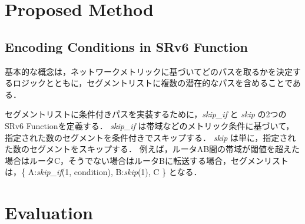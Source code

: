 \documentclass[conference]{IEEEtran}
\begin{document}


\section{Proposed Method}
\subsection{Encoding Conditions in SRv6 Function}

基本的な概念は，ネットワークメトリックに基づいてどのパスを取るかを決定するロジックとともに，セグメントリストに複数の潜在的なパスを含めることである．

セグメントリストに条件付きパスを実装するために，\textit{skip\_if} と \textit{skip} の2つのSRv6 Functionを定義する．
\textit{skip\_if} は帯域などのメトリック条件に基づいて，指定された数のセグメントを条件付きでスキップする．
\textit{skip} は単に，指定された数のセグメントをスキップする．
例えば，ルータAB間の帯域が閾値を超えた場合はルータC，そうでない場合はルータBに転送する場合，セグメンリストは，\{ A:\textit{skip\_if}(1, condition), B:\textit{skip}(1), C \} となる．


\section{Evaluation}
\end{document}
